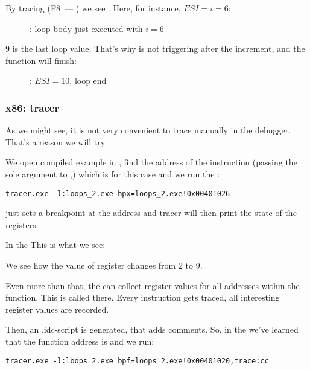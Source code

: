 By tracing (F8~--- \stepover) we see \ESI 
{}.
Here, for instance, $ESI=i=6$:

\begin{figure}[H]
\centering
{}
\caption{\olly: loop body just executed with $i=6$}
\label{fig:loops_olly_2}
\end{figure}

9 is the last loop value.
That's why \JL is not triggering after the \gls{increment}, and the function will finish:

\begin{figure}[H]
\centering
{}
\caption{\olly: $ESI=10$, loop end}
\label{fig:loops_olly_3}
\end{figure}

\subsubsection{x86: tracer}

As we might see, it is not very convenient to trace manually in the debugger.
That's a reason we will try \tracer.

We open compiled example in \IDA, find the address of the instruction 
(passing the sole argument to \ttf,) which is  for this case and we run the \tracer:

\begin{lstlisting}
tracer.exe -l:loops_2.exe bpx=loops_2.exe!0x00401026
\end{lstlisting}

 just sets a breakpoint at the address and tracer will then print the state of the registers.

In the  This is what we see:



We see how the value of \ESI register changes from 2 to 9.

Even more than that, the \tracer can collect register values for all addresses within the function.
This is called  there.
Every instruction gets traced, all interesting register values are recorded.

Then, an \IDA .idc-script is generated, that adds comments.
So, in the \IDA we've learned that the \main function address is  and we run:

\begin{lstlisting}
tracer.exe -l:loops_2.exe bpf=loops_2.exe!0x00401020,trace:cc
\end{lstlisting}

